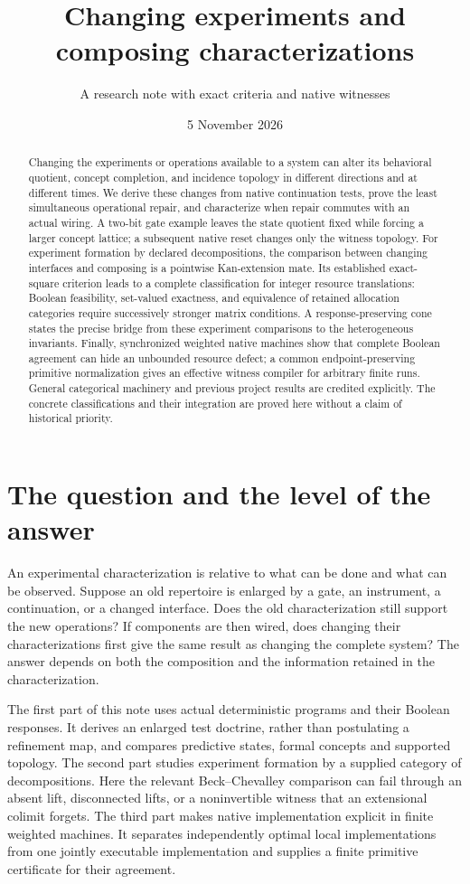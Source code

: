 \documentclass[11pt]{article}
\title{Changing experiments and composing characterizations}
\author{A research note with exact criteria and native witnesses}
\date{5 November 2026}
\theoremstyle{definition}\newtheorem{definition}[theorem]{Definition}
\theoremstyle{remark}\newtheorem{remark}[theorem]{Remark}
\begin{document}
\maketitle
\begin{abstract}
Changing the experiments or operations available to a system can alter its
behavioral quotient, concept completion, and incidence topology in different
directions and at different times. We derive these changes from native
continuation tests, prove the least simultaneous operational repair, and
characterize when repair commutes with an actual wiring. A two-bit gate
example leaves the state quotient fixed while forcing a larger concept
lattice; a subsequent native reset changes only the witness topology.
For experiment formation by declared decompositions, the comparison between
changing interfaces and composing is a pointwise Kan-extension mate.
Its established exact-square criterion leads to a complete classification
for integer resource translations: Boolean feasibility, set-valued exactness,
and equivalence of retained allocation categories require successively
stronger matrix conditions. A response-preserving cone states the precise
bridge from these experiment comparisons to the heterogeneous invariants.
Finally, synchronized weighted native machines show that complete Boolean
agreement can hide an unbounded resource defect; a common endpoint-preserving
primitive normalization gives an effective witness compiler for arbitrary
finite runs. General categorical machinery and previous project results are
credited explicitly. The concrete classifications and their integration are
proved here without a claim of historical priority.
\end{abstract}

\section{The question and the level of the answer}\label{sec:question}
An experimental characterization is relative to what can be done and what
can be observed. Suppose an old repertoire is enlarged by a gate, an
instrument, a continuation, or a changed interface. Does the old
characterization still support the new operations? If components are then
wired, does changing their characterizations first give the same result as
changing the complete system? The answer depends on both the composition
and the information retained in the characterization.

The first part of this note uses actual deterministic programs and their
Boolean responses. It derives an enlarged test doctrine, rather than
postulating a refinement map, and compares predictive states, formal
concepts and supported topology. The second part studies experiment
formation by a supplied category of decompositions. Here the relevant
Beck--Chevalley comparison can fail through an absent lift, disconnected
lifts, or a noninvertible witness that an extensional colimit forgets.
The third part makes native implementation explicit in finite weighted
machines. It separates independently optimal local implementations from
one jointly executable implementation and supplies a finite primitive
certificate for their agreement.
\end{document}
